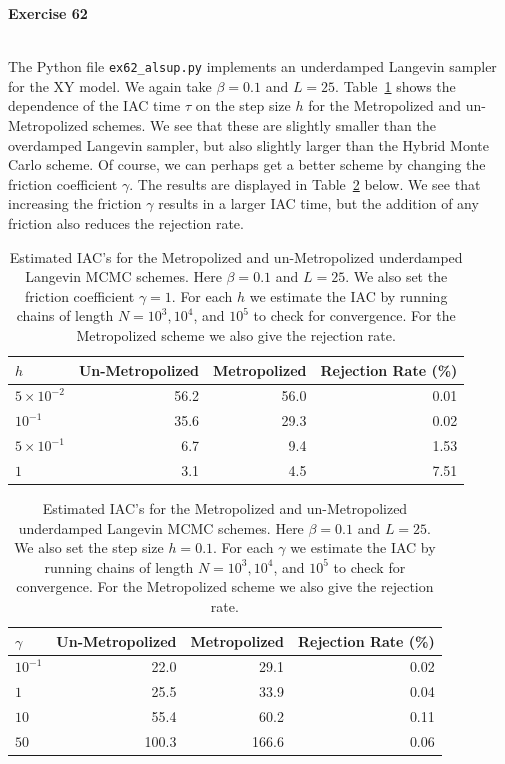 \documentclass[11pt,a4paper]{amsart}
\begin{document}
{\bf Exercise 62}\\
\\
\par The Python file {\tt ex62\_alsup.py} implements an underdamped Langevin sampler for the XY model.  We again take $\beta =0.1$ and $L=25$.  Table~\ref{table:IAC_UL} shows the dependence of the IAC time $\tau$ on the step size $h$ for the Metropolized and un-Metropolized schemes.  We see that these are slightly smaller than the overdamped Langevin sampler, but also slightly larger than the Hybrid Monte Carlo scheme.  Of course, we can perhaps get a better scheme by changing the friction coefficient $\gamma$.  The results are displayed in Table~\ref{table:IAC_friction} below.  We see that increasing the friction $\gamma$ results in a larger IAC time, but the addition of any friction also reduces the rejection rate.  


\begin{table}[H]
\centering
\begin{tabular}{l | r r r}
$h$ & Un-Metropolized & Metropolized & Rejection Rate (\%)\\
\hline
$5\times 10^{-2} $ &  56.2 & 56.0 & 0.01 \\
$10^{-1}$               &  35.6  & 29.3 & 0.02 \\
$5\times 10^{-1} $ &  6.7 & 9.4 & 1.53 \\
$1$                           & 3.1 & 4.5 & 7.51
\end{tabular}
\caption{Estimated IAC's for the Metropolized and un-Metropolized underdamped Langevin MCMC schemes.  Here $\beta=0.1$ and $L=25$.  We also set the friction coefficient $\gamma = 1$.  For each $h$ we estimate the IAC by running chains of length $N = 10^3,10^4$, and $10^5$ to check for convergence.  For the Metropolized scheme we also give the rejection rate.}
\label{table:IAC_UL}
\end{table}



\begin{table}[H]
\centering
\begin{tabular}{l | r r r}
$\gamma$ & Un-Metropolized & Metropolized & Rejection Rate (\%)\\
\hline
$10^{-1}$  & 22.0  & 29.1   & 0.02\\
$1$              & 25.5  & 33.9   & 0.04\\
$10$            & 55.4  & 60.2   & 0.11\\
$50$            &  100.3 & 166.6 & 0.06
\end{tabular}
\caption{Estimated IAC's for the Metropolized and un-Metropolized underdamped Langevin MCMC schemes.  Here $\beta=0.1$ and $L=25$.  We also set the step size $h = 0.1$.  For each $\gamma$ we estimate the IAC by running chains of length $N = 10^3,10^4$, and $10^5$ to check for convergence.  For the Metropolized scheme we also give the rejection rate.}
\label{table:IAC_friction}
\end{table}
\end{document}
